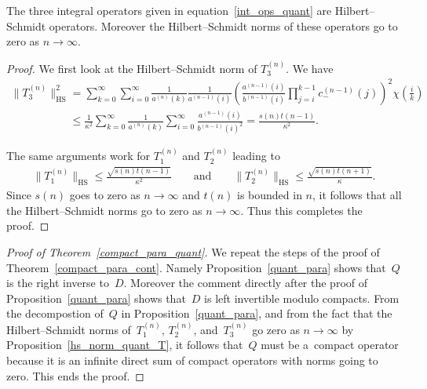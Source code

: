 \begin{prop}
\label{hs_norm_quant_T}
The three integral operators given in equation~\eqref{int_ops_quant} are Hilbert--Schmidt operators.
Moreover the Hilbert--Schmidt norms of these operators go to zero as $n\to\infty$.
\end{prop}

\begin{proof}
We f\/irst look at the Hilbert--Schmidt norm of $T_3^{(n)}$.
We have
\begin{gather*}
\|T_3^{(n)}\|_{\textrm{HS}}^2 = \sum\limits_{k=0}^\infty \sum\limits_{i=0}^\infty
\frac{1}{a^{(n)}(k)}\frac{1}{a^{(n-1)}(i)}\left(\frac{a^{(n-1)}(i)}{b^{(n-1)}(i)}\prod\limits_{j=i}^{k-1}c_-^{(n-1)}(j)\right)^2
\chi\left(\frac{i}{k}\right)
\\
\phantom{\|T_3^{(n)}\|_{\textrm{HS}}^2}
\le \frac{1}{\kappa^2}\sum\limits_{k=0}^\infty
\frac{1}{a^{(n)}(k)}\sum\limits_{i=0}^\infty\frac{a^{(n-1)}(i)}{b^{(n-1)}(i)^2} = \frac{s(n)t(n-1)}{\kappa^2}.
\end{gather*}

The same arguments work for $T_1^{(n)}$ and $T_2^{(n)}$ leading to
\begin{gather*}
\|T_1^{(n)}\|_{\textrm{HS}}\le \frac{\sqrt{s(n)t(n-1)}}{\kappa^2}
\qquad
\textrm{and}
\qquad
\|T_2^{(n)}\|_{\textrm{HS}}\le \frac{\sqrt{s(n)t(n+1)}}{\kappa}.
\end{gather*}
Since $s(n)$ goes to zero as $n\to\infty$ and $t(n)$ is bounded in $n$, it follows that all the Hilbert--Schmidt norms
go to zero as $n\to\infty$.
Thus this completes the proof.
\end{proof}

\begin{proof}[Proof of Theorem~\ref{compact_para_quant}] We repeat the steps of the proof of Theorem~\ref{compact_para_cont}.
Namely Proposition~\ref{quant_para} shows that~$Q$ is the right inverse to~$D$.
Moreover the comment directly after the proof of Proposition~\ref{quant_para} shows that~$D$ is left invertible modulo
compacts.
From the decompostion of~$Q$ in Proposition~\ref{quant_para}, and from the fact that the Hilbert--Schmidt norms of~$T_1^{(n)}$, $T_2^{(n)}$, and~$T_3^{(n)}$ go zero as $n\to\infty$ by Proposition~\ref{hs_norm_quant_T}, it follows that~$Q$ must be a~compact operator because it is an inf\/inite direct sum of compact operators with norms going to zero.
This ends the proof.
\end{proof}
